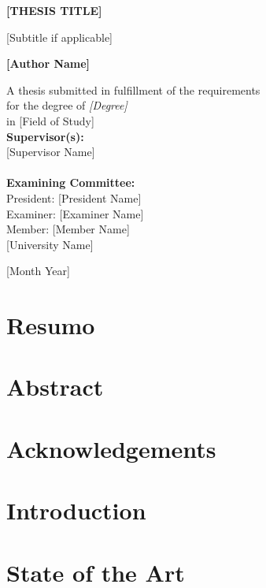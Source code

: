 \documentclass[11pt, a4paper]{report}
\newcommand{\importsection}[1]{}
\newcommand{\frontpage}{
    \begin{titlepage}
        \centering
        \vspace{2cm}
        {\Huge\bfseries [THESIS TITLE]\par}
        \vspace{1.5cm}
        {\Large [Subtitle if applicable]\par}
        \vfill
        {\Large\bfseries [Author Name]\par}
        \vfill
        A thesis submitted in fulfillment of the requirements\\
        for the degree of \emph{[Degree]}\\
        in [Field of Study]\\
        \vspace{2cm}
        {\bfseries Supervisor(s):}\\[0.5em]
        [Supervisor Name]\\
        [Co-supervisor Name]\\[2cm]
        {\bfseries Examining Committee:}\\[0.5em]
        President: [President Name]\\
        Examiner: [Examiner Name]\\
        Member: [Member Name]\\[2cm]
        [University Name]\\
        \vspace{1cm}
        {\large [Month Year]\par}
    \end{titlepage}
}
\newcommand{\copyrightpage}{
    \thispagestyle{empty}
    \vspace*{0.1\textheight} %
    \importsection{copyright} %
    \clearpage %
}
\begin{document}
\frontpage%
\thispagestyle{empty}

\copyrightpage


\chapter*{Resumo}
\importsection{resumo} %
\clearpage %

\chapter*{Abstract}
\importsection{abstract} %
\clearpage %

\chapter*{Acknowledgements}
\importsection{acknowledgements}




\tableofcontents
\clearpage %

\listoffigures
\clearpage %

\listoftables
\clearpage %


\setcounter{page}{1}

\chapter{Introduction}
\importsection{introduction}
\clearpage %

\chapter{State of the Art}
\importsection{stateoftheart}
\clearpage %
\end{document}
